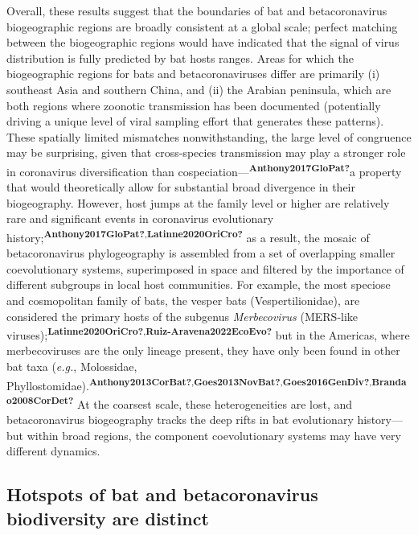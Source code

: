 \documentclass[10pt,oneside]{article}
\begin{document}
Overall, these results suggest that the boundaries of bat and
betacoronavirus biogeographic regions are broadly consistent at a global
scale; perfect matching between the biogeographic regions would have
indicated that the signal of virus distribution is fully predicted by
bat hosts ranges. Areas for which the biogeographic regions for bats and
betacoronaviruses differ are primarily (i) southeast Asia and southern
China, and (ii) the Arabian peninsula, which are both regions where
zoonotic transmission has been documented (potentially driving a unique
level of viral sampling effort that generates these patterns). These
spatially limited mismatches nonwithstanding, the large level of
congruence may be surprising, given that cross-species transmission may
play a stronger role in coronavirus diversification than
cospeciation---\textsuperscript{\textbf{Anthony2017GloPat?}}a property
that would theoretically allow for substantial broad divergence in their
biogeography. However, host jumps at the family level or higher are
relatively rare and significant events in coronavirus evolutionary
history;\textsuperscript{\textbf{Anthony2017GloPat?},\textbf{Latinne2020OriCro?}}
as a result, the mosaic of betacoronavirus phylogeography is assembled
from a set of overlapping smaller coevolutionary systems, superimposed
in space and filtered by the importance of different subgroups in local
host communities. For example, the most speciose and cosmopolitan family
of bats, the vesper bats (Vespertilionidae), are considered the primary
hosts of the subgenus \emph{Merbecovirus} (MERS-like
viruses);\textsuperscript{\textbf{Latinne2020OriCro?},\textbf{Ruiz-Aravena2022EcoEvo?}}
but in the Americas, where merbecoviruses are the only lineage present,
they have only been found in other bat taxa (\emph{e.g.}, Molossidae,
Phyllostomidae).\textsuperscript{\textbf{Anthony2013CorBat?},\textbf{Goes2013NovBat?},\textbf{Goes2016GenDiv?},\textbf{Brandao2008CorDet?}}
At the coarsest scale, these heterogeneities are lost, and
betacoronavirus biogeography tracks the deep rifts in bat evolutionary
history---but within broad regions, the component coevolutionary systems
may have very different dynamics.

\hypertarget{hotspots-of-bat-and-betacoronavirus-biodiversity-are-distinct}{%
\subsection{Hotspots of bat and betacoronavirus biodiversity are
distinct}\label{hotspots-of-bat-and-betacoronavirus-biodiversity-are-distinct}}
\end{document}
